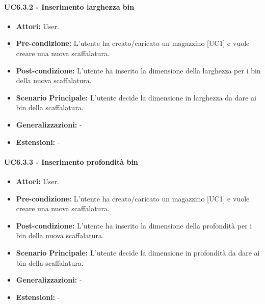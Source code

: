 \paragraph{UC6.3.2 - Inserimento larghezza bin}
\begin{itemize}
    \item \textbf{Attori:} User.
    \item \textbf{Pre-condizione:} L'utente ha creato/caricato un magazzino [UC1] e vuole creare una nuova scaffalatura.
    \item \textbf{Post-condizione:}  L'utente ha inserito la dimensione della larghezza per i bin della nuova scaffalatura.
    \item \textbf{Scenario Principale:}  L'utente decide la dimensione in larghezza da dare ai bin della scaffalatura. 
    \item \textbf{Generalizzazioni:} -
    \item \textbf{Estensioni:} -
\end{itemize}


\paragraph{UC6.3.3 - Inserimento profondità bin}
\begin{itemize}
    \item \textbf{Attori:} User.
    \item \textbf{Pre-condizione:} L'utente ha creato/caricato un magazzino [UC1] e vuole creare una nuova scaffalatura.
    \item \textbf{Post-condizione:}  L'utente ha inserito la dimensione della profondità per i bin della nuova scaffalatura.
    \item \textbf{Scenario Principale:}  L'utente decide la dimensione in profondità da dare ai bin della scaffalatura. 
    \item \textbf{Generalizzazioni:} -
    \item \textbf{Estensioni:} -
\end{itemize}